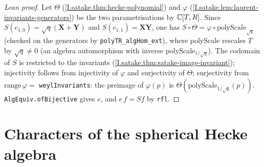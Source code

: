 \begin{proof}[Lean proof]
Let $\Theta$ (\cref{I.satake.thm:hecke-polynomial}) and $\varphi$ (\cref{I.satake.lem:laurent-invariants-generators}) be the two parametrisations by $\mathbb{C}[T,R]$. Since $S(c_{1,0})=\sqrt q(\mathbf X+\mathbf Y)$ and $S(c_{1,1})=\mathbf X\mathbf Y$, one has $S\circ\Theta=\varphi\circ\mathrm{polyScale}_{\sqrt q}$ (checked on the generators by \texttt{polyTR\_algHom\_ext}), where polyScale rescales $T$ by $\sqrt q\ne0$ (an algebra automorphism with inverse polyScale$_{1/\sqrt q}$). The codomain of $S$ is restricted to the invariants (\cref{I.satake.thm:satake-image-invariant}); injectivity follows from injectivity of $\varphi$ and surjectivity of $\Theta$; surjectivity from $\mathrm{range}\,\varphi=$ \texttt{weylInvariants}: the preimage of $\varphi(p)$ is $\Theta(\mathrm{polyScale}_{1/\sqrt q}(p))$. \texttt{AlgEquiv.ofBijective} gives $e$, and $e\,f=S f$ by \texttt{rfl}.
\end{proof}

\section{Characters of the spherical Hecke algebra}


